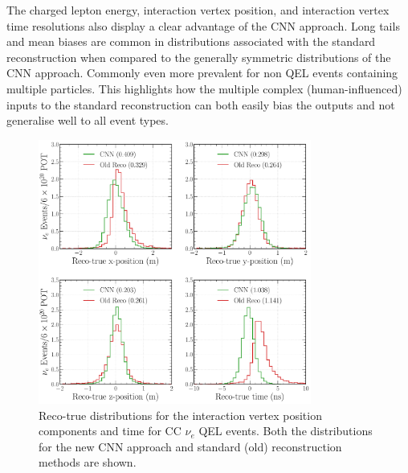 The charged lepton energy, interaction vertex position, and interaction vertex time resolutions
also display a clear advantage of the CNN approach. Long tails and mean biases are common in
distributions associated with the standard reconstruction when compared to the generally symmetric
distributions of the CNN approach. Commonly even more prevalent for non QEL events containing
multiple particles. This highlights how the multiple complex (human-influenced) inputs to the
standard reconstruction can both easily bias the outputs and not generalise well to all event
types.

\begin{figure} %
    \includegraphics[width=0.8\textwidth]{diagrams/7-results/final_vertex_nuel_res_comparison.pdf}
    \caption[Reco-true distributions for the interaction vertex parameters for CC $\nu_{e}$ QEL
        events] {Reco-true distributions for the interaction vertex position components and time
        for CC $\nu_{e}$ QEL events. Both the distributions for the new CNN approach and standard
        (old) reconstruction methods are shown.}
    \label{fig:final_vertex_nuel_res_comparison}
\end{figure}

